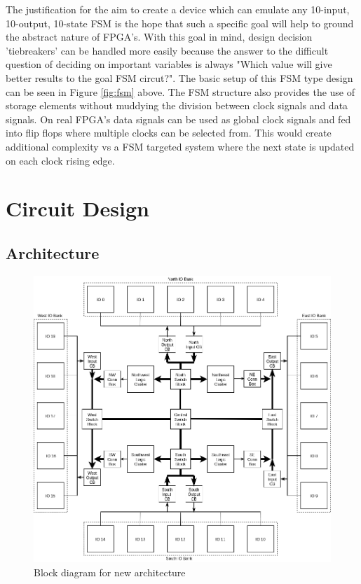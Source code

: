 \documentclass[12pt]{article}
\begin{document}
The justification for the aim to create a device which can emulate any 10-input, 10-output,
10-state FSM is the hope that such a specific goal will help to ground the abstract
nature of FPGA's. With this goal in mind, design decision 'tiebreakers' can be
handled more easily because the answer to the difficult question of deciding on important
variables is always "Which value will give better results to the goal FSM circut?".
The basic setup of this FSM type design can be seen in Figure \ref{fig:fsm} above.
The FSM structure also provides the use of storage elements without muddying the division
between clock signals and data signals. On real FPGA's data signals can be used as global
clock signals and fed into flip flops where multiple clocks can be selected from. This
would create additional complexity vs a FSM targeted system where the next state is
updated on each clock rising edge.


\newpage
\section{Circuit Design}

\subsection{Architecture}

\begin{figure}[htb]
  \centering
  \includegraphics[width=.9\textwidth]{internal_block}
  \caption{Block diagram for new architecture}
  \label{fig:internal_block}
\end{figure}
\end{document}
